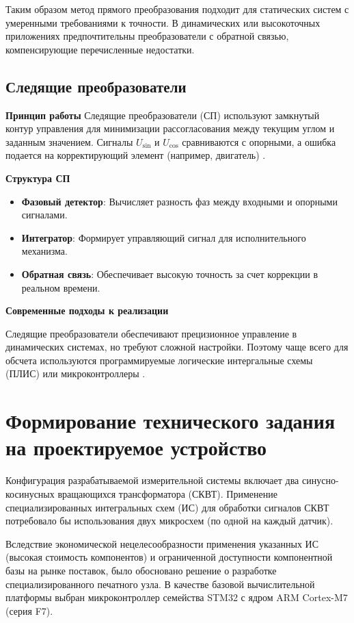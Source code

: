 Таким образом метод прямого преобразования подходит для статических систем с умеренными требованиями к точности. 
В динамических или высокоточных приложениях предпочтительны преобразователи с обратной связью, компенсирующие перечисленные недостатки.

\subsection{Следящие преобразователи}

\textbf{Принцип работы}
Следящие преобразователи (СП) используют замкнутый контур управления для минимизации рассогласования между текущим углом и заданным значением. 
Сигналы \(U_{\sin}\) и \(U_{\cos}\) сравниваются с опорными, а ошибка подается на корректирующий элемент (например, двигатель) \cite{Anufriev2014} \cite{Safronov}.

\textbf{Структура СП}
\begin{itemize}
    \item \textbf{Фазовый детектор}: Вычисляет разность фаз между входными и опорными сигналами.
    \item \textbf{Интегратор}: Формирует управляющий сигнал для исполнительного механизма.
    \item \textbf{Обратная связь}: Обеспечивает высокую точность за счет коррекции в реальном времени.
\end{itemize}

\textbf{Современные подходы к реализации}

Следящие преобразователи обеспечивают прецизионное управление в динамических системах, но требуют сложной настройки.
Поэтому чаще всего для обсчета используются программируемые логические интергальные схемы (ПЛИС) или микроконтроллеры \cite{MilandrSKVT}.

\section{Формирование технического задания на проектируемое устройство}

Конфигурация разрабатываемой измерительной системы включает два синусно-косинусных вращающихся трансформатора (СКВТ). 
Применение специализированных интегральных схем (ИС) для обработки сигналов СКВТ потребовало бы использования двух микросхем (по одной на каждый датчик). 

Вследствие экономической нецелесообразности применения указанных ИС (высокая стоимость компонентов) и ограниченной доступности компонентной базы 
на рынке поставок, было обосновано решение о разработке специализированного печатного узла. В качестве базовой вычислительной платформы выбран микроконтроллер 
семейства STM32 с ядром ARM Cortex-M7 (серия F7).

